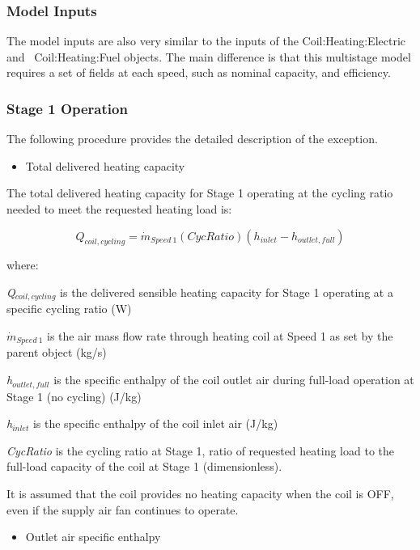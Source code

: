 \subsubsection{Model Inputs}\label{model-inputs-1}

The model inputs are also very similar to the inputs of the Coil:Heating:Electric and~ Coil:Heating:Fuel objects. The main difference is that this multistage model requires a set of fields at each speed, such as nominal capacity, and efficiency.

\subsubsection{Stage 1 Operation}\label{stage-1-operation}

The following procedure provides the detailed description of the exception.

\begin{itemize}
  \item Total delivered heating capacity
\end{itemize}

The total delivered heating capacity for Stage 1 operating at the cycling ratio needed to meet the requested heating load is:

\begin{equation}
  Q_{coil,cycling} = {\dot{m}_{Speed~1}} \left( CycRatio \right) (h_{inlet} - h_{outlet,full})
\end{equation}

where:

\emph{Q\(_{coil,cycling}\)} is the delivered sensible heating capacity for Stage 1 operating at a specific cycling ratio (W)

\({\dot{m}_{Speed~1}}\) is the air mass flow rate through heating coil at Speed 1 as set by the parent object (kg/s)

\emph{h\(_{outlet,full}\)} is the specific enthalpy of the coil outlet air during full-load operation at Stage 1 (no cycling) (J/kg)

\emph{h\(_{inlet}\)} is the specific enthalpy of the coil inlet air (J/kg)

\emph{CycRatio} is the cycling ratio at Stage 1, ratio of requested heating load to the full-load capacity of the coil at Stage 1 (dimensionless).

It is assumed that the coil provides no heating capacity when the coil is OFF, even if the supply air fan continues to operate.

\begin{itemize}
  \item Outlet air specific enthalpy
\end{itemize}

